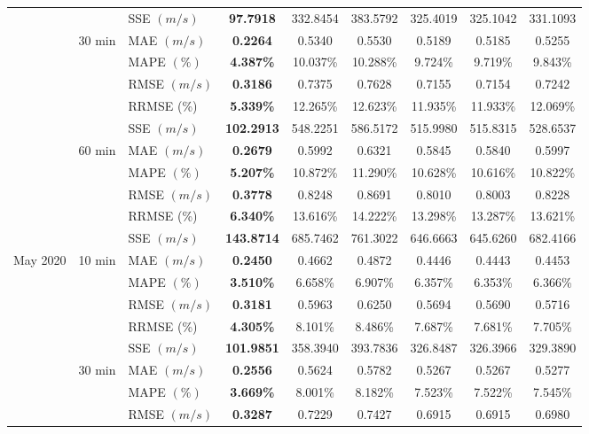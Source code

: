 {\begin{longtable}{lllcccccc}
& {} & {SSE {$(m/s)$}} & {\textbf{97.7918}} & {332.8454} & {383.5792} & {325.4019} & {325.1042} & {331.1093} \\
& 30 min & MAE {$(m/s)$} & \textbf{0.2264} & 0.5340 & 0.5530 & 0.5189 & 0.5185 & 0.5255 \\
&  & MAPE {$(\%)$} & \textbf{4.387\%} & 10.037\% & 10.288\% & 9.724\% & 9.719\% & 9.843\% \\
&  & RMSE {$(m/s)$} & \textbf{0.3186} & 0.7375 & 0.7628 & 0.7155 & 0.7154 & 0.7242 \\
& {} & {RRMSE {(\%)}} & {\textbf{5.339\%}} & {12.265\%} & {12.623\%} & {11.935\%} & {11.933\%} & {12.069\%} \\
& {} & {SSE {$(m/s)$}} & {\textbf{102.2913}} & {548.2251} & {586.5172} & {515.9980} & {515.8315} & {528.6537} \\
& 60 min & MAE {$(m/s)$} & \textbf{0.2679} & 0.5992 & 0.6321 & 0.5845 & 0.5840 & 0.5997 \\
&  & MAPE {$(\%)$} & \textbf{5.207\%} & 10.872\% & 11.290\% & 10.628\% & 10.616\% & 10.822\% \\
&  & RMSE {$(m/s)$} & \textbf{0.3778} & 0.8248 & 0.8691 & 0.8010 & 0.8003 & 0.8228 \\
& {} & {RRMSE {(\%)}} & {\textbf{6.340\%}} & {13.616\%} & {14.222\%} & {13.298\%} & {13.287\%} & {13.621\%} \\
& {} & {SSE {$(m/s)$}} & {\textbf{143.8714}} & {685.7462} & {761.3022} & {646.6663} & {645.6260} & {682.4166} \\ \hline
May 2020 & 10 min & MAE {$(m/s)$} & \textbf{0.2450} & 0.4662 & 0.4872 & 0.4446 & 0.4443 & 0.4453 \\
&  & MAPE {$(\%)$} & \textbf{3.510\%} & 6.658\% & 6.907\% & 6.357\% & 6.353\% & 6.366\% \\
&  & RMSE {$(m/s)$} & \textbf{0.3181} & 0.5963 & 0.6250 & 0.5694 & 0.5690 & 0.5716 \\
& {} & {RRMSE {(\%)}} & {\textbf{4.305\%}} & {8.101\%} & {8.486\%} & {7.687\%} & {7.681\%} & {7.705\%} \\
& {} & {SSE {$(m/s)$}} & {\textbf{101.9851}} & {358.3940} & {393.7836} & {326.8487} & {326.3966} & {329.3890} \\
& 30 min & MAE {$(m/s)$} & \textbf{0.2556} & 0.5624 & 0.5782 & 0.5267 & 0.5267 & 0.5277 \\
&  & MAPE {$(\%)$} & \textbf{3.669\%} & 8.001\% & 8.182\% & 7.523\% & 7.522\% & 7.545\% \\
&  & RMSE {$(m/s)$} & \textbf{0.3287} & 0.7229 & 0.7427 & 0.6915 & 0.6915 & 0.6980 \\

\end{longtable}}
